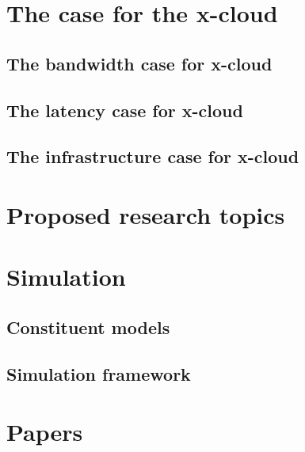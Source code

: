 \documentclass[conference]{IEEEtran}
\newcommand{\xcloud}{x-cloud }
\begin{document}

\section{The case for the \xcloud}


\subsection{The bandwidth case for \xcloud}


\subsection{The latency case for \xcloud}


\subsection{The infrastructure case for \xcloud}



\section{Proposed research topics}



\section{Simulation}

\subsection{Constituent models}


\subsection{Simulation framework}



\section{Papers}

\end{document}
